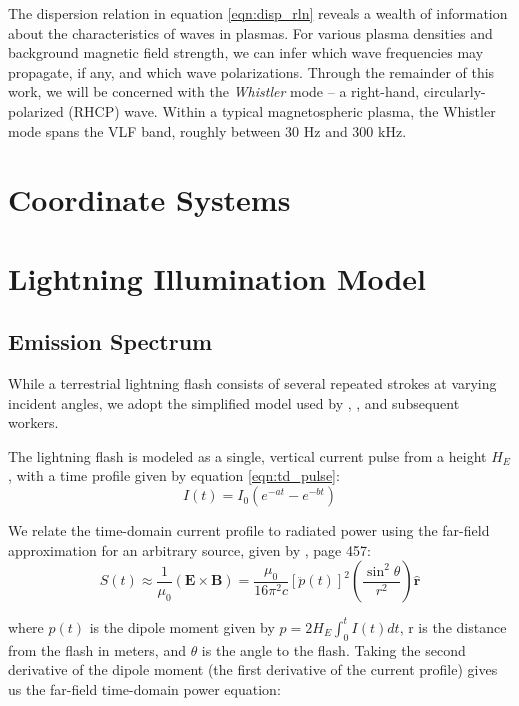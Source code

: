 The dispersion relation in equation \ref{eqn:disp_rln} reveals a wealth of information about the characteristics of waves in plasmas. For various plasma densities and background magnetic field strength, we can infer which wave frequencies may propagate, if any, and which wave polarizations. Through the remainder of this work, we will be concerned with the \emph{Whistler} mode -- a right-hand, circularly-polarized (RHCP) wave. Within a typical magnetospheric plasma, the Whistler mode spans the VLF band, roughly between 30 Hz and 300 kHz.
\section{Coordinate Systems}
\section{Lightning Illumination Model}


\subsection{Emission Spectrum}
While a terrestrial lightning flash consists of several repeated strokes at varying incident angles, we adopt the simplified model used by \citealt{Lauben1998}, \citealt{Bortnik2005}, and subsequent workers.

The lightning flash is modeled as a single, vertical current pulse from a height $H_E$, with a time profile given by equation \ref{eqn:td_pulse}:
\begin{equation}
\label{eqn:td_pulse}
I(t)=I_0(e^{-a t} - e^{-b t})
\end{equation}

We relate the time-domain current profile to radiated power using the far-field approximation for an arbitrary source, given by \cite{Griffiths1999}, page 457:
\begin{equation}
\label{eqn:griffiths_power}
S(t) \approx \frac{1}{\mu_0}(\mathbf{E} \times \mathbf{B}) = \frac{\mu_0}{16\pi^2c}\left[\ddot{p}(t)\right]^2 \left(\frac{\sin^2\theta}{r^2}\right)\mathbf{\hat{r}}
\end{equation}

where $p(t)$ is the dipole moment given by $p=2 H_E \int_0^t{I(t)}dt$, r is the distance from the flash in meters, and $\theta$ is the angle to the flash. Taking the second derivative of the dipole moment (the first derivative of the current profile) gives us the far-field time-domain power equation:

